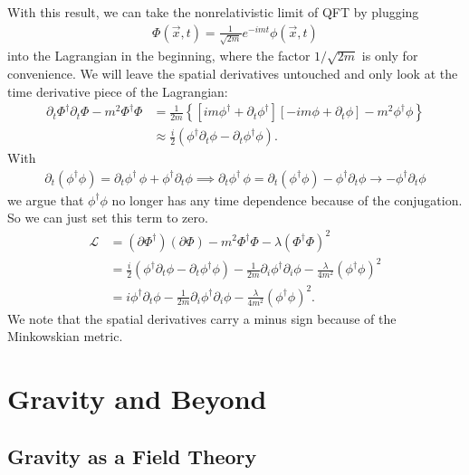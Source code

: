 \documentclass{book}
\theoremstyle{definition}
\newcommand{\p}{\partial}
\newcommand{\lag}{\mathcal{L}}
\newcommand{\nn}{\nonumber}
\newcommand{\f}[2]{\frac{#1}{#2}}
\newcommand{\lp}{\left(}
\newcommand{\rp}{\right)}
\newcommand{\lb}{\left[}
\newcommand{\rb}{\right]}
\newcommand{\lc}{\left\{}
\newcommand{\rc}{\right\}}
\begin{document}
With this result, we can take the nonrelativistic limit of QFT by plugging 
\begin{align}
\Phi(\vec{x},t) = \f{1}{\sqrt{2m}} e^{-imt}\phi(\vec{x},t)
\end{align}
into the Lagrangian in the beginning, where the factor $1/\sqrt{2m}$ is only for convenience. We will leave the spatial derivatives untouched and only look at the time derivative piece of the Lagrangian:
\begin{align}
\p_t \Phi^\dagger \p_t \Phi - m^2 \Phi^\dagger \Phi &= \f{1}{2m}\lc
\lb im\phi^\dagger + \p_t \phi^\dagger \rb
\lb -im\phi + \p_t \phi\rb
- m^2\phi^\dagger\phi
\rc \nn\\
&\approx \f{i}{2}\lp \phi^\dagger \p_t \phi - \p_t\phi^\dagger \phi \rp.
\end{align}
With
\begin{align}
\p_t(\phi^\dagger\phi) = \p_t \phi^\dagger \,\phi + \phi^\dagger \p_t \phi \implies \p_t \phi^\dagger \,\phi = \p_t(\phi^\dagger\phi) - \phi^\dagger \p_t \phi\to -\phi^\dagger \p_t\phi
\end{align}
we argue that $\phi^\dagger\phi$ no longer has any time dependence because of the conjugation. So we can just set this term to zero.
\begin{align}
\lag &= (\p \Phi^\dagger) (\p \Phi) - m^2 \Phi^\dagger\Phi - \lambda(\Phi^\dagger\Phi)^2 \nn\\
&= \f{i}{2}\lp \phi^\dagger \p_t \phi - \p_t\phi^\dagger \phi \rp - \f{1}{2m}\p_i\phi^\dagger \p_i \phi - \f{\lambda}{4m^2}(\phi^\dagger\phi)^2\nn\\
&= i \phi^\dagger \p_t \phi - \f{1}{2m}\p_i\phi^\dagger \p_i \phi - \f{\lambda}{4m^2}(\phi^\dagger\phi)^2.
\end{align}
We note that the spatial derivatives carry a minus sign because of the Minkowskian metric.








\newpage



\section{Gravity and Beyond}




\subsection{Gravity as a Field Theory}
\end{document}
